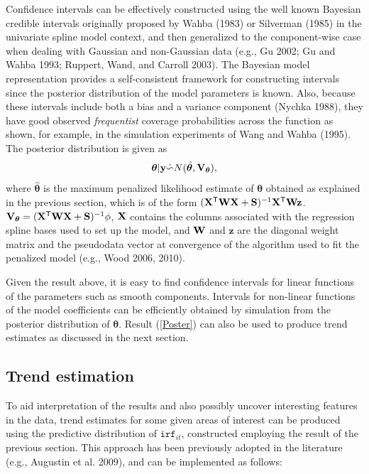 \documentclass[10pt] {article}
\newcommand{\beq}{\begin{equation}}
\newcommand{\eeq}{\end{equation}}
\newcommand{\ts}{^{\sf T}}
\newcommand{\X}{{\bf X}}
\theoremstyle{definition}
\theoremstyle{plain}
\begin{document}
Confidence intervals can be effectively constructed using the well known Bayesian credible intervals originally proposed by Wahba (1983) or Silverman (1985) in the univariate spline model context, and then generalized to the component-wise case when dealing with Gaussian and non-Gaussian data (e.g., Gu 2002; Gu and Wahba 1993; Ruppert, Wand, and Carroll 2003). The Bayesian model representation provides a self-consistent framework for constructing intervals since the posterior distribution of the model parameters is known. Also, because these intervals include both a bias and a variance component (Nychka 1988), they have good observed \textit{frequentist} coverage probabilities across the function as shown, for example, in the simulation experiments of Wang and Wahba (1995). The posterior distribution is given as
\beq
\bm\theta|{\bf y} \dot{\backsim} N( \hat{\bm\theta}, {\bf V}_{\bm\theta} ),
\label{Poster}
\eeq
where $\hat{\bm\theta}$ is the maximum penalized likelihood estimate of $\bm\theta$ obtained as explained in the previous section, which is of the form $(\X\ts{\bf W}\X+{\bf S})^{-1}\X\ts{\bf W}{\bf z}$. ${\bf V}_{\bm\theta} = (\X\ts{\bf W}\X+{\bf S})^{-1}\phi$, $\X$ contains the columns associated with the regression spline bases used to set up the model, and ${\bf W}$ and $\mathbf{z}$ are the diagonal weight matrix and the pseudodata vector at convergence of the algorithm used to fit the penalized model (e.g., Wood 2006, 2010).

Given the result above, it is easy to find confidence intervals for linear functions of the parameters such as smooth components. Intervals for non-linear functions of the model coefficients can be efficiently obtained by simulation from the posterior distribution of $\bm\theta$. Result (\ref{Poster}) can also be used to produce trend estimates as discussed in the next section.

\subsection{Trend estimation \label{TE}}
To aid interpretation of the results and also possibly uncover interesting features in the data, trend estimates for some given areas of interest can be produced using the predictive distribution of $\texttt{irf}_{it}$, constructed employing the result of the previous section. This approach has been previously adopted in the literature (e.g., Augustin et al. 2009), and can be implemented as follows:
\end{document}

